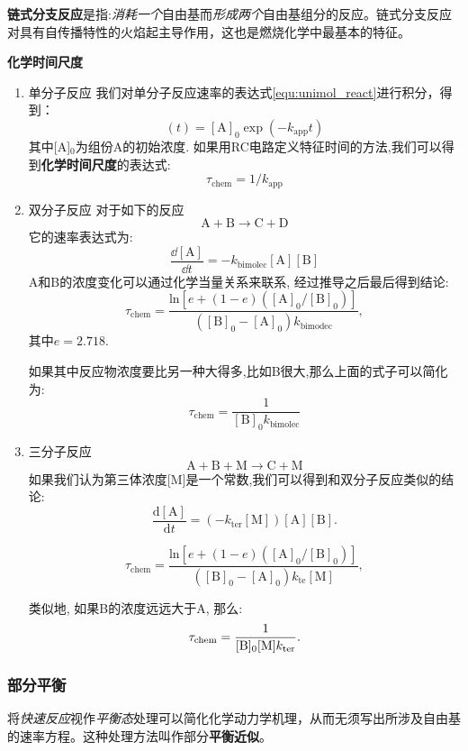 \textbf{链式分支反应}是指:\textit{消耗一个}自由基而\textit{形成两个}自由基组分的反应。链式分支反应对具有自传播特性的火焰起主导作用，这也是燃烧化学中最基本的特征。

\textbf{化学时间尺度}

\begin{enumerate}
    \item 单分子反应
    我们对单分子反应速率的表达式\ref{equ:unimol_react}进行积分，得到：
    \begin{equation}
        [\mathrm{A}](t)=[\mathrm{A}]_{0}\exp(-k_{\mathrm{app}}t)
    \end{equation}其中[A]\(_0\)为组份A的初始浓度. 如果用RC电路定义特征时间的方法,我们可以得到\textbf{化学时间尺度}的表达式:
    \begin{equation}
        \tau_\mathrm{chem} = 1/k_\mathrm{app}
    \end{equation}

    \item 双分子反应
    对于如下的反应
    \[
        \mathrm{A+B\rightarrow C+D}
    \]
    它的速率表达式为:
    \begin{equation}
        \frac{\dd [\mathrm{A}]}{\dd t}=-k_\mathrm{bimolec}\mathrm{[A][B]}
    \end{equation}
    A和B的浓度变化可以通过化学当量关系来联系, 经过推导之后最后得到结论:
    \begin{equation}
        \tau_{\mathrm{chem}}={\frac{\mathrm{ln}[e+(1-e)\mathrm{([A]_{0}/[B]_{0})}]}{([\mathrm{B}]_{0}-\mathrm{[A]}_{0})k_{\mathrm{bimodec}}}},
    \end{equation}其中\(e=2.718\).

    如果其中反应物浓度要比另一种大得多,比如B很大,那么上面的式子可以简化为:
    \begin{equation}
        \tau_\mathrm{chem}=\frac{1}{[\mathrm{B}]_0 k_\mathrm{bimolec}}
    \end{equation}

    \item 三分子反应
    \[\mathrm{A+B+M\rightarrow C + M}\]
    如果我们认为第三体浓度[M]是一个常数,我们可以得到和双分子反应类似的结论:
    \begin{equation}
        {\frac{\mathrm{d}[\mathrm{A}]}{\mathrm{d}t}}=(-k_{\mathrm{ter}}[\mathrm{M}])[\mathrm{A}][\mathrm{B}].
    \end{equation}

    \begin{equation}
        \tau_{\mathrm{chem}}={\frac{\mathrm{ln}[e+(1-e)([\mathrm{A}]_{0}/[\mathrm{B}]_{0})]}{([\mathrm{B}]_{0}-[\mathrm{A}]_{0})k_{\mathrm{te}}[\mathrm{M}]}},
    \end{equation}


    类似地, 如果B的浓度远远大于A, 那么:
    \begin{equation}
        \tau_{\mathrm{chem}}=\frac{1}{[{\rm B}]_{0}[{\rm M}]k_{\mathrm{ter}}}.
    \end{equation}
\end{enumerate}

\subsubsection{部分平衡}
将\textit{快速反应}视作\textit{平衡态}处理可以简化化学动力学机理，从而无须写出所涉及自由基的速率方程。这种处理方法叫作部分\textbf{平衡近似}。
